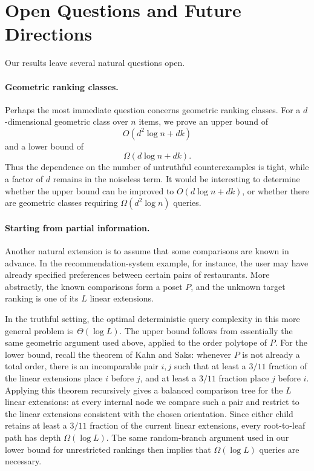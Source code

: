 \documentclass[11pt]{article}
\theoremstyle{definition}
\theoremstyle{remark}
\begin{document}
\section{Open Questions and Future Directions}
\label{sec:open-questions}

Our results leave several natural questions open.

\paragraph{Geometric ranking classes.}
Perhaps the most immediate question concerns geometric ranking classes. For a $d$-dimensional geometric class over $n$ items, we prove an upper bound of
\[
    O(d^2\log n+dk)
\]
and a lower bound of
\[
    \Omega(d\log n+dk).
\]
Thus the dependence on the number of untruthful counterexamples is tight,
while a factor of $d$ remains in the noiseless term. It would be interesting
to determine whether the upper bound can be improved to
$O(d\log n+dk)$, or whether there are geometric classes requiring
$\Omega(d^2\log n)$ queries.

\paragraph{Starting from partial information.}
Another natural extension is to assume that some comparisons are known in
advance. In the recommendation-system example, for instance, the user may
have already specified preferences between certain pairs of restaurants.
More abstractly, the known comparisons form a poset $P$, and the unknown
target ranking is one of its $L$ linear extensions.

In the truthful setting, the optimal deterministic query complexity in this
more general problem is~$\Theta(\log L)$. The upper bound follows from
essentially the same geometric argument used above, applied to the order
polytope of $P$. For the lower bound, recall the theorem of Kahn and Saks:
whenever $P$ is not already a total order, there is an incomparable pair
$i,j$ such that at least a $3/11$ fraction of the linear extensions place
$i$ before $j$, and at least a $3/11$ fraction place $j$ before $i$.
Applying this theorem recursively gives a balanced comparison tree for the
$L$ linear extensions: at every internal node we compare such a pair and
restrict to the linear extensions consistent with the chosen orientation.
Since either child retains at least a $3/11$ fraction of the current linear
extensions, every root-to-leaf path has depth $\Omega(\log L)$. The same
random-branch argument used in our lower bound for unrestricted rankings
then implies that $\Omega(\log L)$ queries are necessary.
\end{document}
